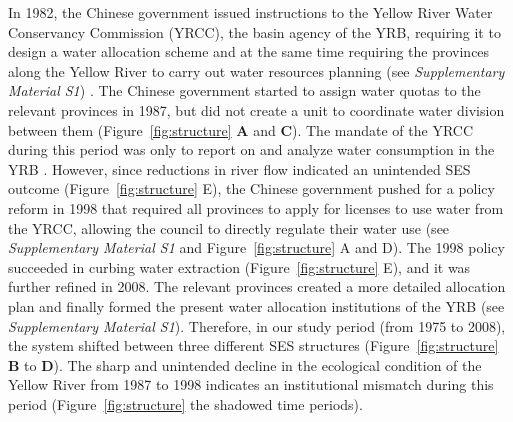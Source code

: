 \documentclass{article}
\begin{document}
In 1982, the Chinese government issued instructions to the Yellow River Water Conservancy Commission (YRCC), the basin agency of the YRB, requiring it to design a water allocation scheme and at the same time requiring the provinces along the Yellow River to carry out water resources planning (see \textit{Supplementary Material S1})
\cite{wangReviewImplementationYellow2019}.
The Chinese government started to assign water quotas to the relevant provinces in 1987, but did not create a unit to coordinate water division between them (Figure~\ref{fig:structure} \textbf{A} and \textbf{C}).
The mandate of the YRCC during this period was only to report on and analyze water consumption in the YRB
\cite{wangReviewImplementationYellow2019}.
However, since reductions in river flow indicated an unintended SES outcome (Figure~\ref{fig:structure} E), the Chinese government pushed for a policy reform in 1998 that required all provinces to apply for licenses to use water from the YRCC, allowing the council to directly regulate their water use (see \textit{Supplementary Material S1} and Figure~\ref{fig:structure} A and D).
The 1998 policy succeeded in curbing water extraction (Figure~\ref{fig:structure} E), and it was further refined in 2008.
The relevant provinces created a more detailed allocation plan and finally formed the present water allocation institutions of the YRB (see \textit{Supplementary Material S1}).
Therefore, in our study period (from 1975 to 2008), the system shifted between three different SES structures (Figure~\ref{fig:structure} \textbf{B} to \textbf{D}).
The sharp and unintended decline in the ecological condition of the Yellow River from 1987 to 1998 indicates an institutional mismatch during this period (Figure~\ref{fig:structure} the shadowed time periods).
\end{document}
